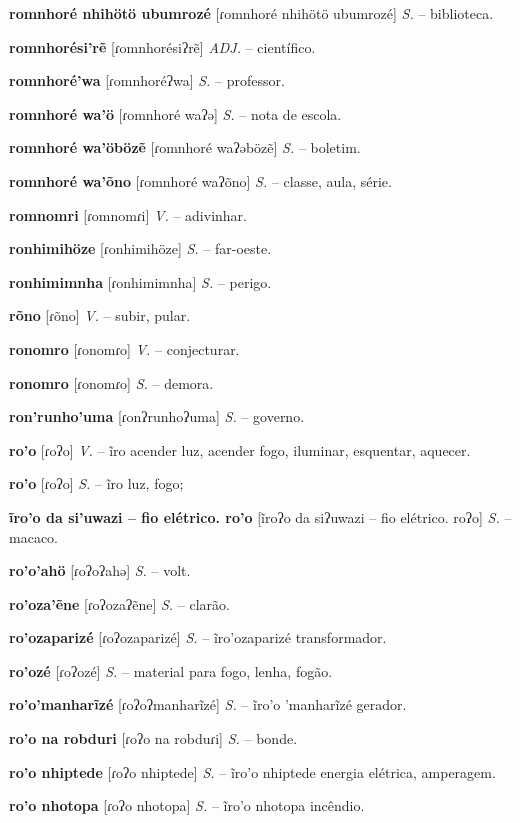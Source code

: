 \textbf{romnhoré nhihötö ubumrozé} [ɾomnhoré nhihötö ubumrozé] \textit{S.} -- biblioteca.

\textbf{romnhorési'rẽ} [ɾomnhorésiʔrẽ] \textit{ADJ.} -- científico.

\textbf{romnhoré'wa} [ɾomnhoréʔwa] \textit{S.} -- professor.

\textbf{romnhoré wa'ö} [ɾomnhoré waʔə] \textit{S.} -- nota de escola.

\textbf{romnhoré wa'öbözẽ} [ɾomnhoré waʔəbözẽ] \textit{S.} -- boletim.

\textbf{romnhoré wa'õno} [ɾomnhoré waʔõno] \textit{S.} -- classe, aula, série.

\textbf{romnomri} [ɾomnomɾi] \textit{V.} -- adivinhar.

\textbf{ronhimihöze} [ɾonhimihöze] \textit{S.} -- far-oeste.

\textbf{ronhimimnha} [ɾonhimimnha] \textit{S.} -- perigo.

\textbf{rõno} [ɾõno] \textit{V.} -- subir, pular.

\textbf{ronomro} [ɾonomɾo] \textit{V.} -- conjecturar.

\textbf{ronomro} [ɾonomɾo] \textit{S.} -- demora.

\textbf{ron'runho'uma} [ɾonʔrunhoʔuma] \textit{S.} -- governo.

\textbf{ro'o} [ɾoʔo] \textit{V.} -- ĩro acender luz, acender fogo, iluminar, esquentar, aquecer.

\textbf{ro'o} [ɾoʔo] \textit{S.} -- ĩro luz, fogo;

\textbf{ĩro'o da si'uwazi -- fio elétrico. ro'o} [ĩroʔo da siʔuwazi -- fio elétrico. roʔo] \textit{S.} -- macaco.

\textbf{ro'o'ahö} [ɾoʔoʔahə] \textit{S.} -- volt.

\textbf{ro'oza'ẽne} [ɾoʔozaʔẽne] \textit{S.} -- clarão.

\textbf{ro'ozaparizé} [ɾoʔozaparizé] \textit{S.} -- ĩro'ozaparizé transformador.

\textbf{ro'ozé} [ɾoʔozé] \textit{S.} -- material para fogo, lenha, fogão.

\textbf{ro'o'manharĩzé} [ɾoʔoʔmanharĩzé] \textit{S.} -- ĩro'o 'manharĩzé gerador.

\textbf{ro'o na robduri} [ɾoʔo na robduɾi] \textit{S.} -- bonde.

\textbf{ro'o nhiptede} [ɾoʔo nhiptede] \textit{S.} -- ĩro'o nhiptede energia elétrica, amperagem.

\textbf{ro'o nhotopa} [ɾoʔo nhotopa] \textit{S.} -- ĩro'o nhotopa incêndio.

